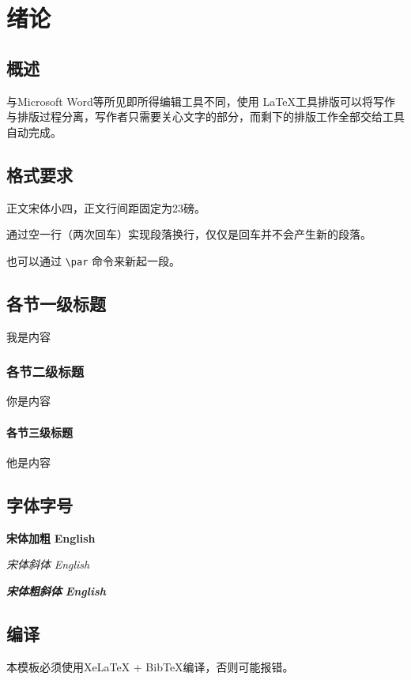 
\chapter{绪论}

\section{概述}

与Microsoft Word等所见即所得编辑工具不同，使用 \LaTeX 工具排版可以将写作与排版过程分离，写作者只需要关心文字的部分，而剩下的排版工作全部交给工具自动完成。

\section{格式要求}
正文宋体小四，正文行间距固定为23磅。

通过空一行（两次回车）实现段落换行，仅仅是回车并不会产生新的段落。 \par

也可以通过 \verb|\par| 命令来新起一段。

\section{各节一级标题}
我是内容

\subsection{各节二级标题}
你是内容

\subsubsection{各节三级标题}
他是内容

\section{字体字号}
{\songti \bfseries 宋体加粗} {\textbf{English}}

{\songti \itshape 宋体斜体} {\textit{English}}

{\songti \bfseries \itshape 宋体粗斜体} {\textbf{\textit{English}}}

\section{编译}
本模板必须使用XeLaTeX + BibTeX编译，否则可能报错。